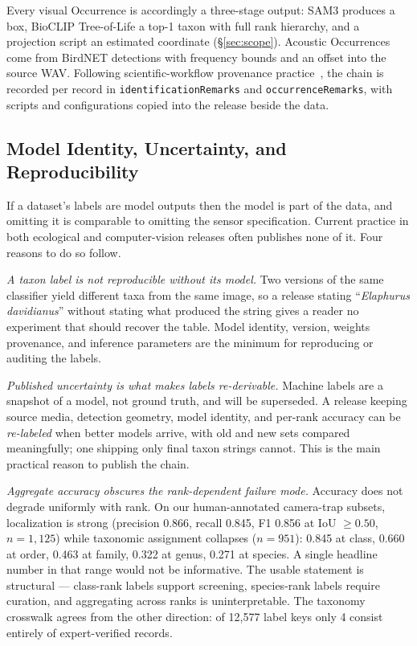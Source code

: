\documentclass[sigconf]{acmart}
\begin{document}
Every visual Occurrence is accordingly a three-stage output: SAM3
produces a box, BioCLIP Tree-of-Life a top-1 taxon with full rank
hierarchy, and a projection script an estimated coordinate
(\S\ref{sec:scope}). Acoustic Occurrences come from BirdNET detections
with frequency bounds and an offset into the source WAV. Following
scientific-workflow provenance practice~\cite{simmhan2005provenance}, the chain is
recorded per record in \texttt{identificationRemarks} and
\texttt{occurrenceRemarks}, with scripts and configurations copied into
the release beside the data.

\subsection{Model Identity, Uncertainty, and Reproducibility}
\label{sec:modelprov}

If a dataset's labels are model outputs then the model is part of the
data, and omitting it is comparable to omitting the sensor
specification. Current practice in both ecological and computer-vision
releases often publishes none of it. Four reasons to do so follow.

\emph{A taxon label is not reproducible without its model.} Two versions
of the same classifier yield different taxa from the same image, so a
release stating ``\emph{Elaphurus davidianus}'' without stating what
produced the string gives a reader no experiment that should recover the
table. Model identity, version, weights provenance, and inference
parameters are the minimum for reproducing or auditing the labels.

\emph{Published uncertainty is what makes labels re-derivable.} Machine
labels are a snapshot of a model, not ground truth, and will be
superseded. A release keeping source media, detection geometry, model
identity, and per-rank accuracy can be \emph{re-labeled} when better
models arrive, with old and new sets compared meaningfully; one shipping
only final taxon strings cannot. This is the main practical reason to
publish the chain.

\emph{Aggregate accuracy obscures the rank-dependent failure mode.}
Accuracy does not degrade uniformly with rank. On our human-annotated
camera-trap subsets, localization is strong (precision 0.866, recall
0.845, F1 0.856 at IoU $\geq 0.50$, $n{=}1{,}125$) while taxonomic
assignment collapses ($n{=}951$): 0.845 at class, 0.660 at order,
0.463 at family, 0.322 at genus, 0.271 at species. A single headline number in that range would
not be informative. The usable statement is structural ---
class-rank labels support screening, species-rank labels require
curation, and aggregating across ranks is uninterpretable. The taxonomy
crosswalk agrees from the other direction: of 12{,}577 label keys only 4
consist entirely of expert-verified records.
\end{document}
